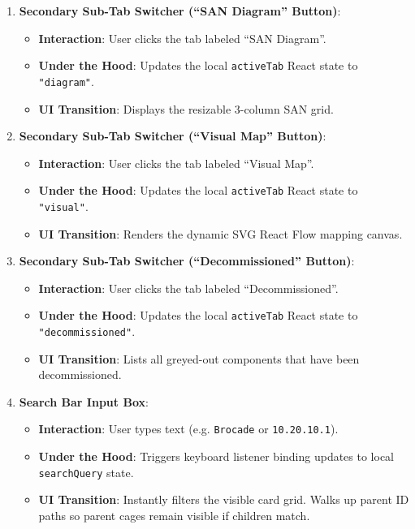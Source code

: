 \documentclass[11pt,a4paper]{article}
\begin{document}
\begin{enumerate}
    \item \textbf{Secondary Sub-Tab Switcher (``SAN Diagram'' Button)}:
    \begin{itemize}
        \item \textbf{Interaction}: User clicks the tab labeled ``SAN Diagram''.
        \item \textbf{Under the Hood}: Updates the local \texttt{activeTab} React state to \texttt{"diagram"}.
        \item \textbf{UI Transition}: Displays the resizable 3-column SAN grid.
    \end{itemize}
    
    \item \textbf{Secondary Sub-Tab Switcher (``Visual Map'' Button)}:
    \begin{itemize}
        \item \textbf{Interaction}: User clicks the tab labeled ``Visual Map''.
        \item \textbf{Under the Hood}: Updates the local \texttt{activeTab} React state to \texttt{"visual"}.
        \item \textbf{UI Transition}: Renders the dynamic SVG React Flow mapping canvas.
    \end{itemize}
    
    \item \textbf{Secondary Sub-Tab Switcher (``Decommissioned'' Button)}:
    \begin{itemize}
        \item \textbf{Interaction}: User clicks the tab labeled ``Decommissioned''.
        \item \textbf{Under the Hood}: Updates the local \texttt{activeTab} React state to \texttt{"decommissioned"}.
        \item \textbf{UI Transition}: Lists all greyed-out components that have been decommissioned.
    \end{itemize}
    
    \item \textbf{Search Bar Input Box}:
    \begin{itemize}
        \item \textbf{Interaction}: User types text (e.g. \texttt{Brocade} or \texttt{10.20.10.1}).
        \item \textbf{Under the Hood}: Triggers keyboard listener binding updates to local \texttt{searchQuery} state.
        \item \textbf{UI Transition}: Instantly filters the visible card grid. Walks up parent ID paths so parent cages remain visible if children match.
    \end{itemize}
    

\end{enumerate}
\end{document}
